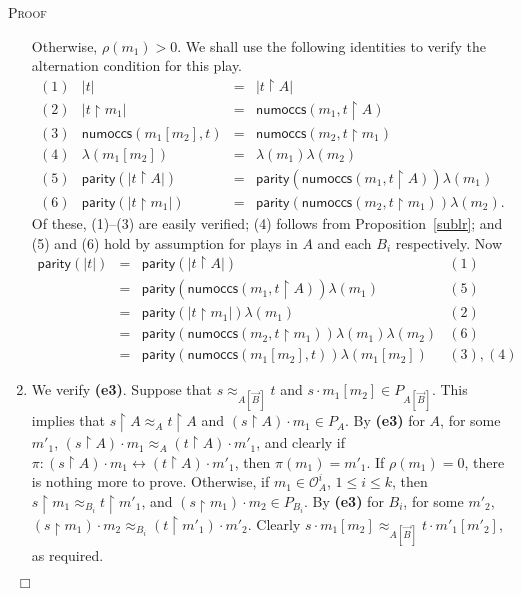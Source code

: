 \documentclass[a4paper,11pt]{article}
\newcommand{\gequiv}{\approx}
\newcommand{\numoccs}[2]{\mathsf{numoccs}(#1 , #2 )}
\newcommand{\parity}{\mathsf{parity}}
\newcommand{\restrict}{{\upharpoonright}}
\newcommand{\Occ}{\mathcal{O}}
\newenvironment{proof}{\textsc{Proof}\ }{$\;\; \Box$}
\begin{document}
\begin{proof}
\begin{enumerate}
Otherwise, $\rho (m_1 )>0$. We shall use the following identities to verify the alternation condition for this play.
\[ \begin{array}{llcl}
(1) & |t| & = & |t \restrict A| \\
(2) & |t \restrict m_1 | & = & \numoccs{m_1}{t \restrict A} \\
(3) & \numoccs{m_1[m_2]}{t} & = & \numoccs{m_2}{t \restrict m_1} \\
(4) & \lambda(m_1[m_2]) & = & \lambda (m_1 ) \lambda (m_2 ) \\
(5) & \parity (|t \restrict A|) & = & \parity (\numoccs{m_1}{t \restrict A}) \lambda (m_1 ) \\
(6) & \parity (|t \restrict m_1 |) & = & \parity (\numoccs{m_2}{t \restrict m_1}) \lambda (m_2 ) .
\end{array} \]
Of these, (1)--(3) are easily verified; (4) follows from Proposition~\ref{sublr}; and (5) and (6) hold by assumption for plays in $A$ and each $B_i$ respectively. Now
\[ \begin{array}{lclr}
\parity (|t|) & = & \parity (|t \restrict A|) & (1) \\
& = & \parity (\numoccs{m_1}{t \restrict A}) \lambda (m_1 ) & (5) \\
& = & \parity (|t \restrict m_1 |) \lambda (m_1 ) & (2) \\
& = & \parity (\numoccs{m_2}{t \restrict m_1}) \lambda (m_1 ) \lambda (m_2 ) & (6) \\
& = & \parity (\numoccs{m_1[m_2]}{t}) \lambda (m_1[m_2]) & (3),(4)
\end{array} \]

\item We verify \textbf{(e3)}. Suppose that $s \gequiv_{A[\vec{B}]} t$ and $s\cdot m_1[m_2] \in P_{A[\vec{B}]}$.
This implies that $s \restrict A \gequiv_A t \restrict A$ and $(s
\restrict A)  \cdot m_1 \in P_A$. By \textbf{(e3)} for $A$, for
some $m'_1$, $(s \restrict A)\cdot m_1 \gequiv_A (t \restrict
A)\cdot m'_1$, and clearly if $\pi : (s \restrict A)\cdot m_1
\longleftrightarrow (t \restrict A)\cdot m'_1$, then $\pi (m_1 ) =
m'_1$. If $\rho (m_1) =0$, there is nothing more to prove.
Otherwise, if $m_1 \in \Occ_A^i$, $1 \leq i \leq k$, then $s
\restrict m_1 \gequiv_{B_i} t \restrict m'_1$, and $(s \restrict
m_1 )\cdot m_2 \in P_{B_i}$. By \textbf{(e3)} for $B_i$, for some
$m'_2$, $(s \restrict m_1 )\cdot m_2 \gequiv_{B_i} (t \restrict
m'_1 )\cdot m'_2$. Clearly $s \cdot m_1[m_2] \gequiv_{A[\vec{B}]}
t \cdot m'_1[m'_2]$, as required.
\end{enumerate}
\end{proof}
\end{document}
